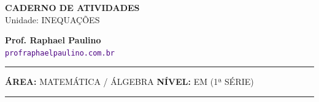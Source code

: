 \documentclass[twoside, 10pt, a4paper]{article}
\begin{document}
\thispagestyle{empty}
\color{Cinzablack}
\vspace*{-1.8cm}

\noindent
\begin{minipage}{\textwidth}
    \selectfont
    \noindent
    \begin{minipage}[t]{0.70\linewidth}
        {\Large \bfseries \MakeUppercase{Caderno de Atividades}}\\[0.1cm]
        {\large \textmd{\textcolor{CinzaEscuro}{Unidade: INEQUAÇÕES}}}
    \end{minipage}%
    \begin{minipage}[t]{0.30\linewidth}
        \raggedleft
        \small \textbf{Prof. Raphael Paulino}\\
        \textsf{\small \textcolor{indigo}{\texttt{profraphaelpaulino.com.br}}}
    \end{minipage}
    
    \vspace{0.15cm}
    \noindent\rule{\linewidth}{1.2pt}
    \vspace{-0.1cm}
    \footnotesize\textsf{\textbf{ÁREA:} MATEMÁTICA / ÁLGEBRA \hfill \textbf{NÍVEL:} EM (1ª SÉRIE)}
    \vspace{0.1cm}
    \noindent\rule{\linewidth}{0.4pt}
\end{minipage}
\end{document}
